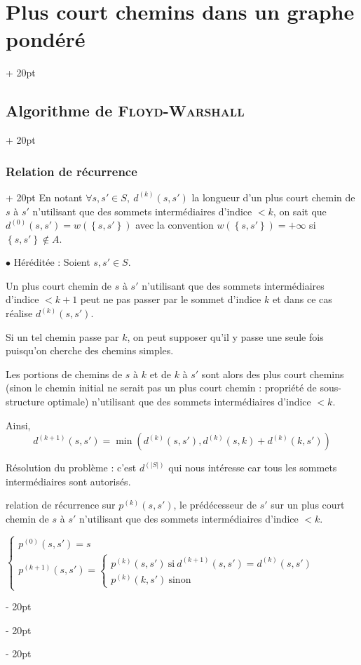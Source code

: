 \documentclass[a4paper, 12pt, twoside]{article}
\newcommand{\lr}[1]{\left( #1 \right)}
\newcommand{\set}[1]{\left\{ #1 \right\}}
\newcommand{\abs}[1]{\left\lvert #1 \right\rvert}
\newcommand{\ind}[1][20pt]{\advance\leftskip + #1}
\newcommand{\deind}[1][20pt]{\advance\leftskip - #1}
\newenvironment{indt}[2][20pt]{#2 \par \ind[#1]}{\par \deind} %
\begin{document}
\begin{indt}{\section{Plus court chemins dans un graphe pondéré}}
\begin{indt}{\subsection{Algorithme de \textsc{Floyd-Warshall}}}
\begin{indt}{\subsubsection{Relation de récurrence}}
                En notant $\forall s, s' \in S,\ d^{(k)}(s, s')$ la longueur d'un plus court chemin de $s$ à $s'$ n'utilisant que des sommets intermédiaires d'indice $< k$, on sait que $d^{(0)}(s, s') = w(\set{s, s'})$ avec la convention $w(\set{s, s'}) = +\infty$ si $\set{s, s'} \notin A$.

                \vspace{6pt}
                
                $\bullet$ Héréditée : Soient $s, s' \in S$.

                Un plus court chemin de $s$ à $s'$ n'utilisant que des sommets intermédiaires d'indice $< k + 1$ peut ne pas passer par le sommet d'indice $k$ et dans ce cas réalise $d^{(k)}(s, s')$.

                Si un tel chemin passe par $k$, on peut supposer qu'il y passe une seule fois puisqu'on cherche des chemins simples.

                Les portions de chemins de $s$ à $k$ et de $k$ à $s'$ sont alors des plus court chemins (sinon le chemin initial ne serait pas un plus court chemin : propriété de sous-structure optimale) n'utilisant que des sommets intermédiaires d'indice $< k$.

                Ainsi,
                \[
                    d^{(k + 1)}(s, s') = \min\!\lr{d^{(k)}(s, s'), d^{(k)}(s, k) + d^{(k)}(k, s')}
                \]

                Résolution du problème : c'est $d^{(\abs S)}$ qui nous intéresse car tous les sommets intermédiaires sont autorisés.

                \vspace{12pt}
                
                 relation de récurrence sur $p^{(k)}(s, s')$, le prédécesseur de $s'$ sur un plus court chemin de $s$ à $s'$ n'utilisant que des sommets intermédiaires d'indice $< k$.

                $
                    \begin{cases}
                        p^{(0)}(s, s') = s
                        \\
                        p^{(k + 1)}(s, s') =
                        \begin{cases}
                            p^{(k)}(s, s')\ \text{si}\ d^{(k + 1)}(s, s') = d^{(k)}(s, s')
                            \\
                            p^{(k)}(k, s')\ \text{sinon}
                        \end{cases}
                    \end{cases}
                $
            \end{indt}


\end{indt}
\end{indt}
\end{document}
